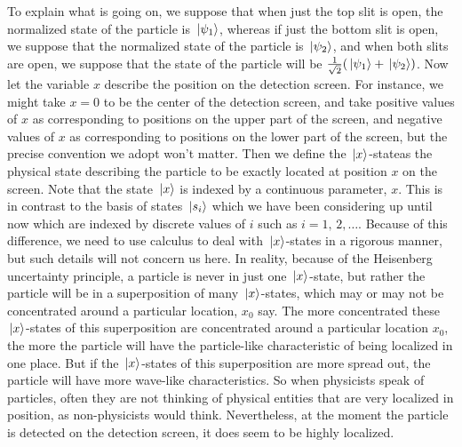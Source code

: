    To explain what is going on, we suppose that when just the top slit is open, the normalized state of the particle is $\ket*{\psi_1}$,\label{psi_slit} whereas if just the bottom slit is open, we suppose that the normalized state of the particle is $\ket*{\psi_2}$, and when both slits are open, we suppose that the state of the particle will be $\frac{1}{\sqrt{2}}(\ket*{\psi_1}+\ket*{\psi_2})$. 
     Now let the variable $x$ describe the position on the detection screen. For instance, we might take $x=0$ to be the center of the detection screen, and take  positive values of $x$ as corresponding to positions on the upper part of the screen, and negative values of $x$ as corresponding to positions on the lower part of the screen, but the precise convention we adopt won't matter. Then we define the  $\ket*{x}$-state\footnotemark\;as the physical state describing the particle to be exactly located at position $x$ on the screen. Note that the state $\ket*{x}$ is indexed by a continuous parameter, $x$. This is in contrast to the basis of states $\ket*{s_i}$ which we have been considering up until now which are indexed by discrete values of $i$ such as $i=1,\,2,\ldots.$ Because of this difference, we need to use calculus to deal with $\ket*{x}$-states in a rigorous manner, but such details will not concern us here. In reality, because of the Heisenberg uncertainty principle, a particle is never in just one $\ket*{x}$-state, but rather the particle will be in a superposition of many $\ket*{x}$-states, which may or may not be concentrated around a particular location, $x_0$ say. The more concentrated these  $\ket*{x}$-states of this superposition are concentrated around a particular location $x_0$, the more the particle will have the particle-like characteristic of being localized in one place. But if the  $\ket*{x}$-states of this superposition are more spread out, the particle will have more wave-like characteristics. So when physicists speak of particles, often they are not thinking of physical entities that are very localized in position, as non-physicists would think. Nevertheless, at the moment the particle is detected on the detection screen, it does seem to be highly localized.
